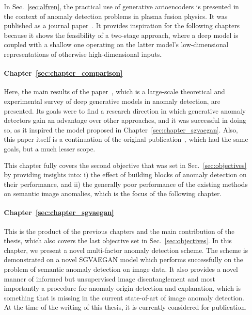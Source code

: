 In Sec.~\ref{sec:alfven}, the practical use of generative autoencoders is presented in the context of anomaly detection problems in plasma fusion physics. It was published as a journal paper~\cite{vskvara2020detection}. It provides inspiration for the following chapters because it shows the feasibility of a two-stage approach, where a deep model is coupled with a shallow one operating on the latter model's low-dimensional representations of otherwise high-dimensional inputs.

\paragraph{Chapter~\ref{sec:chapter_comparison}} Here, the main results of the paper~\cite{vskvara2021comparison}, which is a large-scale theoretical and experimental survey of deep generative models in anomaly detection, are presented. Its goals were to find a research direction in which generative anomaly detectors gain an advantage over other approaches, and it was successful in doing so, as it inspired the model proposed in Chapter~\ref{sec:chapter_sgvaegan}. Also, this paper itself is a continuation of the original publication~\cite{vskvara2018generative}, which had the same goals, but a much lesser scope.

This chapter fully covers the second objective that was set in Sec.~\ref{sec:objectives} by providing insights into: i) the effect of building blocks of anomaly detection on their performance, and ii) the generally poor performance of the existing methods on semantic image anomalies, which is the focus of the following chapter.

\paragraph{Chapter~\ref{sec:chapter_sgvaegan}} This is the product of the previous chapters and the main contribution of the thesis, which also covers the last objective set in Sec.~\ref{sec:objectives}. In this chapter, we present a novel multi-factor anomaly detection scheme. The scheme is demonstrated on a novel SGVAEGAN model which performs successfully on the problem of semantic anomaly detection on image data. It also provides a novel manner of informed but unsupervised image disentanglement and most importantly a procedure for anomaly origin detection and explanation, which is something that is missing in the current state-of-art of image anomaly detection. At the time of the writing of this thesis, it is currently considered for publication.


